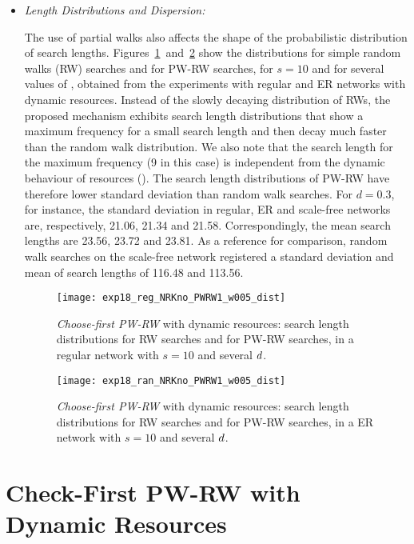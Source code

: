 \documentclass[]{elsarticle}
\newcommand{\s}		{\ensuremath{s}}		\newcommand{\sopt}	{\ensuremath{s_{opt}}}		\newcommand{\p}		{\ensuremath{p}}		\newcommand{\W}		{\ensuremath{W}}		\newcommand{\w}		{\ensuremath{w}}		\newcommand{\lsave}	{\ensuremath{\overline{l}_s}}	\newcommand{\lave}	{\ensuremath{\overline{l}}}	\newcommand{\lopt}	{\ensuremath{\overline{l}_{opt}}}
\begin{document}
\begin{itemize}
\item{\it Length Distributions and Dispersion:}

The use of partial walks also affects the shape of the probabilistic distribution of search lengths. Figures~\ref{fig:regular_dist}~and~\ref{fig:random_dist} show the distributions for simple random walks (RW) searches and for PW-RW searches, for $\s=10$ and for several values of \pd, obtained from the experiments with regular and ER networks with dynamic resources. Instead of the slowly decaying distribution of RWs, the proposed mechanism exhibits search length distributions that show a maximum frequency for a small search length and then decay much faster than the random walk distribution. We also note that the search length for the maximum frequency (9 in this case) is independent from the dynamic behaviour of resources (\pd). The search length distributions of PW-RW have therefore lower standard deviation than random walk searches. For $d=0.3$, for instance, the standard deviation in regular, ER and scale-free networks are, respectively, 21.06, 21.34 and 21.58. Correspondingly, the mean search lengths are 23.56, 23.72 and 23.81. As a reference for comparison, random walk searches on the scale-free network registered a standard deviation and mean of search lengths of 116.48 and 113.56.

\begin{figure}[h]
 \centering
 \texttt{[image: exp18\_reg\_NRKno\_PWRW1\_w005\_dist]}
 \caption{\emph{Choose-first PW-RW} with dynamic resources: search length distributions for RW searches and for PW-RW searches, in a regular network with $\s=10$ and several $d$.}
 \label{fig:regular_dist}
\end{figure}

\begin{figure}[h]
 \centering
 \texttt{[image: exp18\_ran\_NRKno\_PWRW1\_w005\_dist]}
 \caption{\emph{Choose-first PW-RW} with dynamic resources: search length distributions for RW searches and for PW-RW searches, in a ER network with $\s=10$ and several $d$.}
 \label{fig:random_dist}
\end{figure}

\end{itemize}

\section{Check-First PW-RW with Dynamic Resources}
\end{document}
